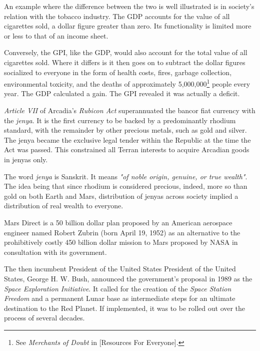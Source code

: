 An example where the difference between the two is well illustrated is in society's relation with the tobacco industry. The GDP accounts for the value of all cigarettes sold, a dollar figure greater than zero. Its functionality is limited more or less to that of an income sheet.

Conversely, the GPI, like the GDP, would also account for the total value of all cigarettes sold. Where it differs is it then goes on to subtract the dollar figures socialized to everyone in the form of health costs, fires, garbage collection, environmental toxicity, and the deaths of approximately 5,000,000\footnote{See {\it Merchants of Doubt} in [Resources For Everyone].} people every year. The GDP calculated a gain. The GPI revealed it was actually a deficit.

{\it Article VII} of Arcadia's {\it Rubicon Act} superannuated the bancor fiat currency with the {\it jenya}. It is the first currency to be backed by a predominantly rhodium standard, with the remainder by other precious metals, such as gold and silver. The jenya became the exclusive legal tender within the Republic at the time the Act was passed. This constrained all Terran interests to acquire Arcadian goods in jenyas only.

The word {\it jenya} is Sanskrit. It means {\it "of noble origin, genuine, or true wealth"}. The idea being that since rhodium is considered precious, indeed, more so than gold on both Earth and Mars, distribution of jenyas across society implied a distribution of real wealth to everyone.

Mars Direct is a \type{$}50 billion dollar plan proposed by an American aerospace engineer named Robert Zubrin (born April 19, 1952) as an alternative to the prohibitively costly \type{$}450 billion dollar mission to Mars proposed by NASA in consultation with its government.

The then incumbent President of the United States President of the United States, George H. W. Bush, announced the government's proposal in 1989 as the {\it Space Exploration Initiative}. It called for the creation of the {\it Space Station Freedom} and a permanent Lunar base as intermediate steps for an ultimate destination to the Red Planet. If implemented, it was to be rolled out over the process of several decades.


